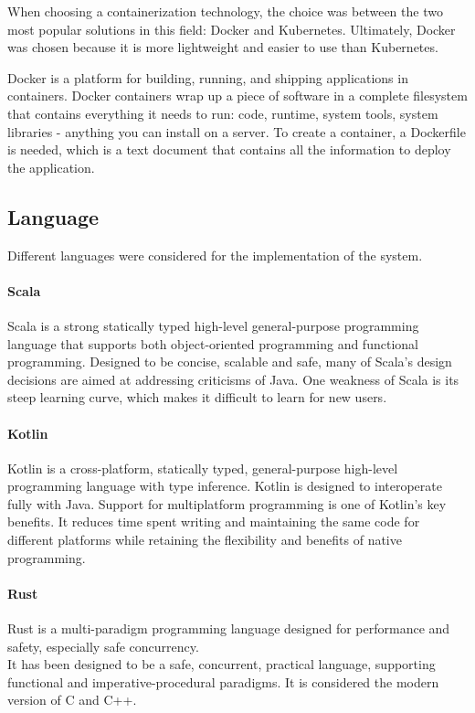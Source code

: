\documentclass[12pt,a4paper,openright,twoside]{book}
\begin{document}
When choosing a containerization technology, the choice was between the two most popular solutions in this field: Docker and Kubernetes.
Ultimately, Docker was chosen because it is more lightweight and easier to use than Kubernetes.

Docker is a platform for building, running, and shipping applications in containers.
Docker containers wrap up a piece of software in a complete filesystem that contains everything it needs to run:
code, runtime, system tools, system libraries - anything you can install on a server.
To create a container, a Dockerfile is needed, which is a text document that contains all the information to deploy the application.

\subsection{Language}
Different languages were considered for the implementation of the system.

\paragraph*{Scala}
Scala is a strong statically typed high-level general-purpose programming language that supports both object-oriented 
programming and functional programming. 
Designed to be concise, scalable and safe, many of Scala's design decisions are aimed at addressing criticisms of Java.
\cite{1}
One weakness of Scala is its steep learning curve, which makes it difficult to learn for new users.

\paragraph*{Kotlin}
Kotlin is a cross-platform, statically typed, general-purpose high-level programming language with type inference. 
Kotlin is designed to interoperate fully with Java.
Support for multiplatform programming is one of Kotlin’s key benefits. It reduces time spent writing and maintaining 
the same code for different platforms while retaining the flexibility and benefits of native programming.

\paragraph*{Rust}

Rust is a multi-paradigm programming language designed for performance and safety, especially safe concurrency. \\
It has been designed to be a safe, concurrent, practical language, supporting functional and imperative-procedural paradigms.
It is considered the modern version of C and C++.
\end{document}
